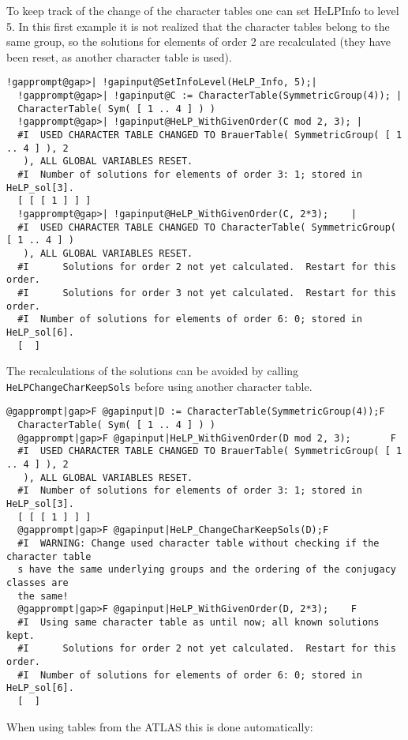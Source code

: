 \documentclass[a4paper,11pt]{report}
\begin{document}
{{ To keep track of the change of the character tables one can set
HeLP{\textunderscore}Info to level 5. In this first example it is not realized
that the character tables belong to the same group, so the solutions for
elements of order 2 are recalculated (they have been reset, as another
character table is used). 
\begin{Verbatim}[commandchars=!@|,fontsize=\small,frame=single,label=Example]
  !gapprompt@gap>| !gapinput@SetInfoLevel(HeLP_Info, 5);|
  !gapprompt@gap>| !gapinput@C := CharacterTable(SymmetricGroup(4)); |
  CharacterTable( Sym( [ 1 .. 4 ] ) )
  !gapprompt@gap>| !gapinput@HeLP_WithGivenOrder(C mod 2, 3); |
  #I  USED CHARACTER TABLE CHANGED TO BrauerTable( SymmetricGroup( [ 1 .. 4 ] ), 2
   ), ALL GLOBAL VARIABLES RESET.
  #I  Number of solutions for elements of order 3: 1; stored in HeLP_sol[3].
  [ [ [ 1 ] ] ]
  !gapprompt@gap>| !gapinput@HeLP_WithGivenOrder(C, 2*3);    |
  #I  USED CHARACTER TABLE CHANGED TO CharacterTable( SymmetricGroup( [ 1 .. 4 ] )
   ), ALL GLOBAL VARIABLES RESET.
  #I      Solutions for order 2 not yet calculated.  Restart for this order.
  #I      Solutions for order 3 not yet calculated.  Restart for this order.
  #I  Number of solutions for elements of order 6: 0; stored in HeLP_sol[6].
  [  ]
\end{Verbatim}
 The recalculations of the solutions can be avoided by calling \texttt{HeLP{\textunderscore}ChangeCharKeepSols} before using another character table. 
\begin{Verbatim}[commandchars=@|F,fontsize=\small,frame=single,label=Example]
  @gapprompt|gap>F @gapinput|D := CharacterTable(SymmetricGroup(4));F
  CharacterTable( Sym( [ 1 .. 4 ] ) )
  @gapprompt|gap>F @gapinput|HeLP_WithGivenOrder(D mod 2, 3);       F
  #I  USED CHARACTER TABLE CHANGED TO BrauerTable( SymmetricGroup( [ 1 .. 4 ] ), 2
   ), ALL GLOBAL VARIABLES RESET.
  #I  Number of solutions for elements of order 3: 1; stored in HeLP_sol[3].
  [ [ [ 1 ] ] ]
  @gapprompt|gap>F @gapinput|HeLP_ChangeCharKeepSols(D);F
  #I  WARNING: Change used character table without checking if the character table
  s have the same underlying groups and the ordering of the conjugacy classes are 
  the same!
  @gapprompt|gap>F @gapinput|HeLP_WithGivenOrder(D, 2*3);    F
  #I  Using same character table as until now; all known solutions kept.
  #I      Solutions for order 2 not yet calculated.  Restart for this order.
  #I  Number of solutions for elements of order 6: 0; stored in HeLP_sol[6].
  [  ]
\end{Verbatim}
 When using tables from the ATLAS this is done automatically: 
}}
\end{document}
